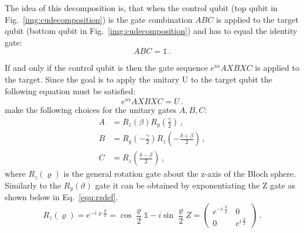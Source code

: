 
The idea of this decomposition is, that when the control qubit (top qubit in Fig.~\ref{img:cudecomposition}) is \0 the gate combination $ABC$ is applied to the target qubit (bottom qubit in Fig.~\ref{img:cudecomposition}) and has to equal the identity gate:
\begin{equation}
\label{equ:abcidentity}
ABC = \mathbb{1}\, .
\end{equation}

If and only if the control qubit is \1 then the gate sequence $e^{i\alpha}AXBXC$ is applied to the target. Since the goal is to apply the unitary U to the target qubit the following equation must be satisfied:
\begin{equation}
\label{equ:UAXBXC}
e^{i\alpha}AXBXC = U\, .
\end{equation}
 make the following choices for the unitary gates $A,B,C$:
\begin{align}\label{equ:1abc}
A &=  R_z(\beta)R_y(\frac{\gamma}{2})\, ,\\
\label{equ:2abc}
B &= R_y(-\frac{\gamma}{2})R_z(-\frac{\delta+\beta}{2})\, ,\\
\label{equ:3abc}
C &= R_z(\frac{\delta-\beta}{2})\, ,
\end{align}
where $R_z(\varrho)$ is the general rotation gate about the z-axis of the Bloch sphere. Similarly to the $R_y(\vartheta)$ gate it can be obtained by exponentiating the Z gate as shown below in Eq.~\ref{equ:rzdef}.
\begin{equation}
\label{equ:rzdef}
R_z(\varrho) = e^{-i\varrho\frac{Z}{2}} = \cos\frac{\varrho}{2} \mathbb{1}- i\sin\frac{\varrho}{2}Z = \begin{pmatrix}
e^{-i\frac{\varrho}{2}} & 0 \\
0 & e^{i\frac{\varrho}{2}}
\end{pmatrix}\, .
\end{equation}


